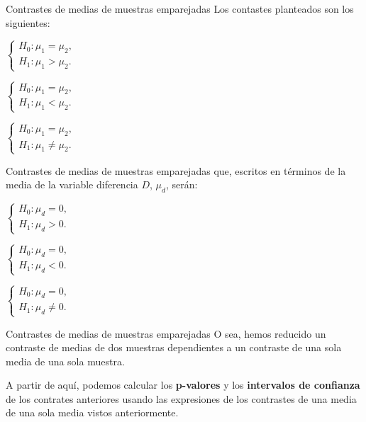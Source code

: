 \documentclass[
  ignorenonframetext,
]{beamer}
\begin{document}
\begin{frame}{Contrastes de medias de muestras emparejadas}
\protect\hypertarget{contrastes-de-medias-de-muestras-emparejadas-1}{}
Los contastes planteados son los siguientes:

\(\left\{\begin{array}{l} H_0:\mu_1=\mu_2,\\ H_1:\mu_1> \mu_2. \end{array}\right.\)

\(\left\{\begin{array}{l} H_0:\mu_1=\mu_2,\\ H_1:\mu_1< \mu_2. \end{array}\right.\)

\(\left\{\begin{array}{l} H_0:\mu_1=\mu_2,\\ H_1:\mu_1\neq \mu_2. \end{array}\right.\)
\end{frame}

\begin{frame}{Contrastes de medias de muestras emparejadas}
\protect\hypertarget{contrastes-de-medias-de-muestras-emparejadas-2}{}
que, escritos en términos de la media de la variable diferencia \(D\),
\(\mu_d\), serán:

\(\left\{\begin{array}{l} H_0:\mu_d=0,\\ H_1:\mu_d> 0. \end{array}\right.\)

\(\left\{\begin{array}{l} H_0:\mu_d=0,\\ H_1:\mu_d< 0. \end{array}\right.\)

\(\left\{\begin{array}{l} H_0:\mu_d=0,\\ H_1:\mu_d\neq 0. \end{array}\right.\)
\end{frame}

\begin{frame}{Contrastes de medias de muestras emparejadas}
\protect\hypertarget{contrastes-de-medias-de-muestras-emparejadas-3}{}
O sea, hemos reducido un contraste de medias de dos muestras
dependientes a un contraste de una sola media de una sola muestra.

A partir de aquí, podemos calcular los \textbf{p-valores} y los
\textbf{intervalos de confianza} de los contrates anteriores usando las
expresiones de los contrastes de una media de una sola media vistos
anteriormente.
\end{frame}
\end{document}
